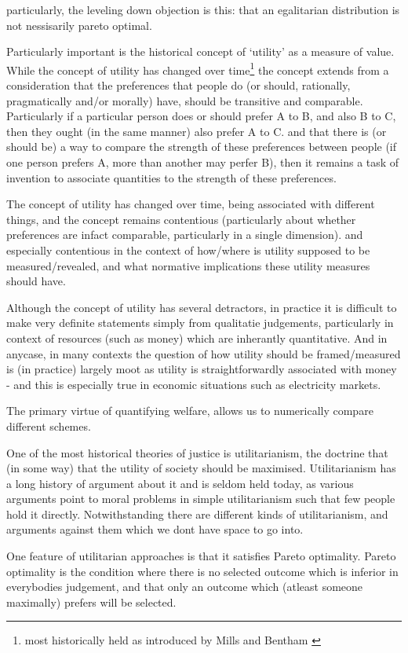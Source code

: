 particularly, the leveling down objection is this: that an egalitarian distribution is not nessisarily pareto optimal.


Particularly important is the historical concept of `utility' as a measure of value.
While the concept of utility has changed over time\footnote{most historically held as introduced by Mills and Bentham\cite{} \cite{}} the concept extends from a consideration that the preferences that people do (or should, rationally, pragmatically and/or morally) have, should be transitive and comparable.
Particularly if a particular person does or should prefer A to B, and also B to C, then they ought (in the same manner) also prefer A to C.
and that there is (or should be) a way to compare the strength of these preferences between people (if one person prefers A, more than another may perfer B), then it remains a task of invention to associate quantities to the strength of these preferences.

The concept of utility has changed over time, being associated with different things, and the concept remains contentious (particularly about whether preferences are infact comparable, particularly in a single dimension). and especially contentious in the context of how/where is utility supposed to be measured/revealed, and what normative implications these utility measures should have.

Although the concept of utility has several detractors, in practice it is difficult to make very definite statements simply from qualitatie judgements, particularly in context of resources (such as money) which are inherantly quantitative.
And in anycase, in many contexts the question of how utility should be framed/measured is (in practice) largely moot as utility is straightforwardly associated with money - and this is especially true in economic situations such as electricity markets.

The primary virtue of quantifying welfare, allows us to numerically compare different schemes.

One of the most historical theories of justice is utilitarianism, the doctrine that (in some way) that the utility of society should be maximised.
Utilitarianism has a long history of argument about it and is seldom held today, as various arguments point to moral problems in simple utilitarianism such that few people hold it directly.
Notwithstanding there are different kinds of utilitarianism, and arguments against them which we dont have space to go into.

One feature of utilitarian approaches is that it satisfies Pareto optimality.
Pareto optimality is the condition where there is no selected outcome which is inferior in everybodies judgement, and that only an outcome which (atleast someone maximally) prefers will be selected.

